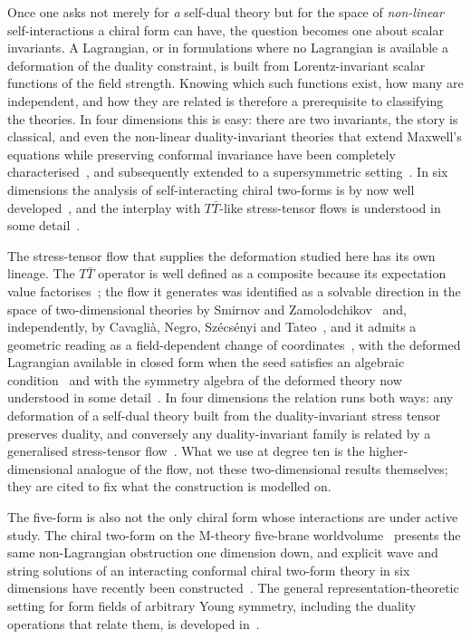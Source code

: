 \documentclass[11pt,a4paper]{article}
\theoremstyle{definition}
\theoremstyle{remark}
\begin{document}
Once one asks not merely for \emph{a} self-dual theory but for the space of
\emph{non-linear} self-interactions a chiral form can have, the question becomes
one about scalar invariants. A Lagrangian, or in formulations where no Lagrangian
is available a deformation of the duality constraint, is built from
Lorentz-invariant scalar functions of the field strength. Knowing which such
functions exist, how many are independent, and how they are related is therefore
a prerequisite to classifying the theories. In four dimensions this is easy:
there are two invariants, the story is classical, and even the non-linear
duality-invariant theories that extend Maxwell's equations while preserving
conformal invariance have been completely
characterised~\cite{Bandos:2020hgy}, and subsequently extended to a
supersymmetric setting~\cite{Bandos:2021rqy}. In six dimensions the
analysis of self-interacting chiral two-forms is by now well
developed~\cite{Townsend:2019ftg,Ferko:2024chiral}, and the interplay with
$T\bar T$-like stress-tensor flows is understood in some
detail~\cite{Brizio:2026ttbar}.

The stress-tensor flow that supplies the deformation studied here has its own
lineage. The $T\bar T$ operator is well defined as a composite because its
expectation value factorises~\cite{Zamolodchikov:2004ce}; the flow it generates
was identified as a solvable direction in the space of two-dimensional theories
by Smirnov and Zamolodchikov~\cite{Smirnov:2016lqw} and, independently, by
Cavagli\`a, Negro, Sz\'ecs\'enyi and Tateo~\cite{Cavaglia:2016oda}, and it
admits a geometric reading as a field-dependent change of
coordinates~\cite{Conti:2018tca}, with the deformed Lagrangian available in
closed form when the seed satisfies an algebraic
condition~\cite{Bonelli:2018kik} and with the symmetry algebra of the deformed
theory now understood in some detail~\cite{Guica:2020eab}. In four dimensions
the relation runs both ways: any deformation of a self-dual theory built from
the duality-invariant stress tensor preserves duality, and conversely any
duality-invariant family is related by a generalised stress-tensor
flow~\cite{Ferko:2023wyi}. What we use at degree ten is the higher-dimensional
analogue of the flow, not these two-dimensional results themselves; they are
cited to fix what the construction is modelled on.

The five-form is also not the only chiral form whose interactions are under
active study. The chiral two-form on the M-theory five-brane
worldvolume~\cite{Witten:1996hc} presents the same non-Lagrangian obstruction
one dimension down, and explicit wave and string solutions of an interacting
conformal chiral two-form theory in six dimensions have recently been
constructed~\cite{Deger:2024jyq}. The general representation-theoretic setting
for form fields of arbitrary Young symmetry, including the duality operations
that relate them, is developed in~\cite{Bekaert:2002dt}.
\end{document}
